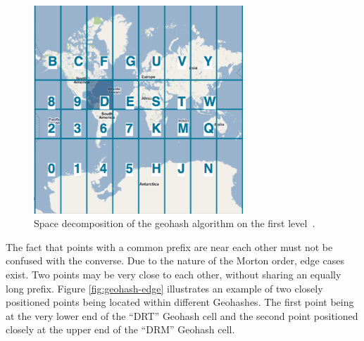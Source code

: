 \begin{figure}[h]
  \begin{center}
    \includegraphics[width=0.7\textwidth]{figures/geohash_example.png}
    \caption{Space decomposition of the geohash algorithm on the first level~\cite{Smiley11geohash}.}
    \label{fig:geohash}
  \end{center}
\end{figure}

The fact that points with a common prefix are near each other must not be confused with the converse. Due to the nature of the Morton order, edge cases exist. Two points may be very close to each other, without sharing an equally long prefix. Figure \ref{fig:geohash-edge} illustrates an example of two closely positioned points being located within different Geohashes. The first point being at the very lower end of the ``DRT'' Geohash cell and the second point positioned closely at the upper end of the ``DRM'' Geohash cell. 

